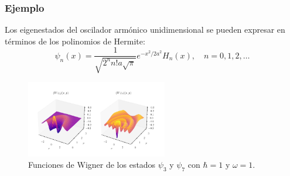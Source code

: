 \documentclass[10pt, spanish]{beamer}
\begin{document}
  \begin{frame}
    \frametitle{Ejemplo}

    Los eigenestados del oscilador armónico unidimensional
    se pueden expresar en términos de los polinomios de
    Hermite:
    \begin{equation}
      \psi_n(x) = \frac{1}{\sqrt{2^{n} n! a \sqrt{\pi}}}
      e^{-x^2 / 2a^2} H_n(x),
      \quad n = 0,1,2,\ldots
    \end{equation}

    \begin{figure}[h]
      \centering
      \includegraphics[width=0.55\textwidth]{
      imgs/harmonic_osc_wigner.png}
      \caption{
      Funciones de Wigner de los estados $\psi_3$ y $\psi_7$ 
      con $\hbar = 1$ y $\omega = 1$.}
      \label{fig:harmonic_osc_wigner}
    \end{figure}
  \end{frame}
\end{document}
